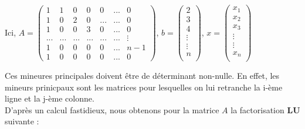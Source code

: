 \documentclass[10pt,a4paper]{article}
\begin{document}
Ici, $A=\begin{pmatrix}
1 & 1 & 0 & 0 & 0 & ... & 0\\
1 & 0 & 2 & 0 & ... & ... & 0\\
1 & 0 & 0 & 3 & 0 & ... & 0\\
... & ... & ... & ... & ... & ... & \vdots \\
1 & 0 & 0 & 0 & 0 & ... & n-1\\
1 & 0 & 0 & 0 & 0 & ... & 0
\end{pmatrix}$, $b = \left( \begin{array}{c}
2 \\
3 \\
4 \\
\vdots \\
\vdots \\
n \\
\end{array} \right)$, $x = \left( \begin{array}{c}
x_{1} \\
x_{2} \\
x_{3} \\
\vdots \\
\vdots \\
x_{n} \\
\end{array} \right) $\linebreak\linebreak

Ces mineures principales doivent être de déterminant non-nulle. En effet, les mineurs prinicpaux sont les matrices pour lesquelles on lui retranche la i-ème ligne et la j-ème colonne. \\

D'après un calcul fastidieux, nous obtenons pour la matrice $A$ la factorisation \textbf{LU} suivante :
\end{document}
